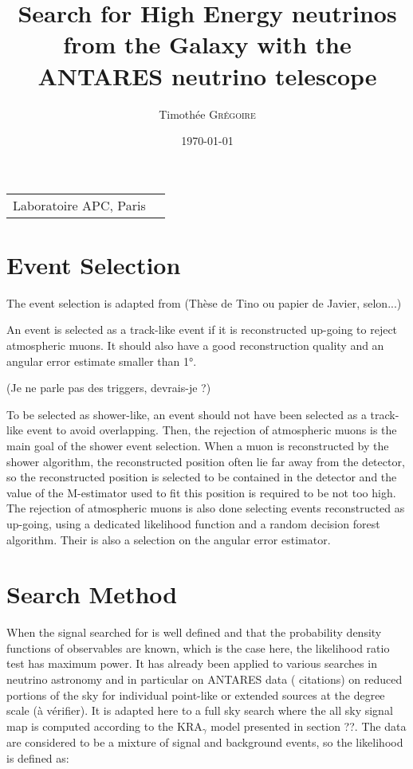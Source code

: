\documentclass[final,twoside,onecolumn,10pt]{article}
\title{Search for High Energy neutrinos from the Galaxy with the ANTARES neutrino telescope} %
\author{Timothée \textsc{Grégoire}} %
\date{\today} %
\begin{document}

\maketitle %

\begin{center}
	\begin{tabular}{l r}
	Laboratoire APC, Paris %
	\end{tabular}
\end{center}



\section{Event Selection}
	The event selection is adapted from (Thèse de Tino ou papier de Javier, selon...)

	An event is selected as a track-like event if it is reconstructed up-going to reject atmospheric muons. It should also have a good reconstruction quality and an angular error estimate smaller than 1°.

	(Je ne parle pas des triggers, devrais-je ?)

	To be selected as shower-like, an event should not have been selected as a track-like event to avoid overlapping.
	Then, the rejection of atmospheric muons is the main goal of the  shower event selection.
	When a muon is reconstructed by the shower algorithm, the reconstructed position often lie far away from the detector, so the reconstructed position is selected to be contained in the detector and the value of the M-estimator used to fit this position is required to be not too high.
	The rejection of atmospheric muons is also done selecting events reconstructed as up-going, using a dedicated likelihood function and a random decision forest algorithm. Their is also a selection on the angular error estimator.


\section{Search Method}
	When the signal searched for is well defined and that the probability density functions of observables are known, which is the case here, the likelihood ratio test has maximum power. It has already been applied to various searches in neutrino astronomy and in particular on ANTARES data (\cite{Tino_ICRC} citations) on reduced portions of the sky for individual point-like or extended sources at the degree scale (à vérifier).
	It is adapted here to a full sky search where the all sky signal map is computed according to the KRA$_{γ}$ model presented in section ??. The data are considered to be a mixture of signal and background events, so the likelihood is defined as:
\end{document}
